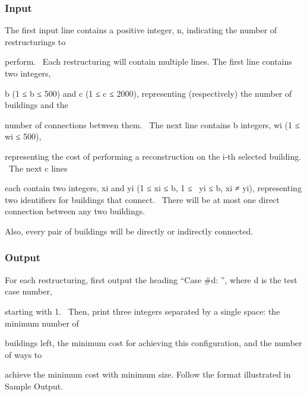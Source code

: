 \subsubsection{Input}

The first input line contains a positive integer, n, indicating the number of restructurings to 

perform.  Each restructuring will contain multiple lines. The first line contains two integers,

b (1 ≤ b ≤ 500) and c (1 ≤ c ≤ 2000), representing (respectively) the number of buildings and the 

number of connections between them.  The next line contains b integers, wi (1 ≤ wi ≤ 500), 

representing the cost of performing a reconstruction on the i-th selected building.  The next c lines 

each contain two integers, xi and yi (1 ≤ xi ≤ b, 1 ≤  yi ≤ b, xi ≠ yi), representing two identifiers for buildings that connect.  There will be at most one direct connection between any two buildings.

Also, every pair of buildings will be directly or indirectly connected.

\subsubsection{Output}

For each restructuring, first output the heading “Case \#d: ”, where d is the test case number, 

starting with 1.  Then, print three integers separated by a single space: the minimum number of 

buildings left, the minimum cost for achieving this configuration, and the number of ways to 

achieve the minimum cost with minimum size. Follow the format illustrated in Sample Output.


